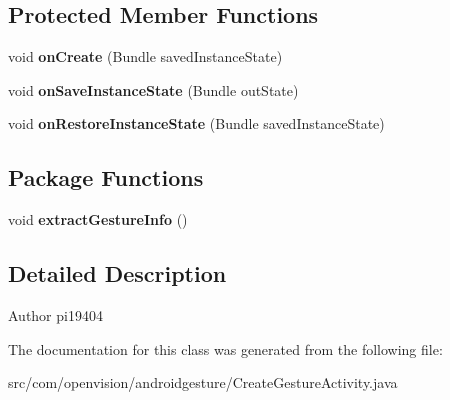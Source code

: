 \subsection*{\-Protected \-Member \-Functions}
\begin{DoxyCompactItemize}
\item 
\hypertarget{classcom_1_1openvision_1_1androidgesture_1_1CreateGestureActivity_a4e81a9e8913ce9db0ca81aa8aab43a62}{void {\bfseries on\-Create} (\-Bundle saved\-Instance\-State)}\label{classcom_1_1openvision_1_1androidgesture_1_1CreateGestureActivity_a4e81a9e8913ce9db0ca81aa8aab43a62}

\item 
\hypertarget{classcom_1_1openvision_1_1androidgesture_1_1CreateGestureActivity_a0b5e3f5d97404c75edc228910d093af5}{void {\bfseries on\-Save\-Instance\-State} (\-Bundle out\-State)}\label{classcom_1_1openvision_1_1androidgesture_1_1CreateGestureActivity_a0b5e3f5d97404c75edc228910d093af5}

\item 
\hypertarget{classcom_1_1openvision_1_1androidgesture_1_1CreateGestureActivity_ac77cfb3c65018452e2e8951b6311492c}{void {\bfseries on\-Restore\-Instance\-State} (\-Bundle saved\-Instance\-State)}\label{classcom_1_1openvision_1_1androidgesture_1_1CreateGestureActivity_ac77cfb3c65018452e2e8951b6311492c}

\end{DoxyCompactItemize}
\subsection*{\-Package \-Functions}
\begin{DoxyCompactItemize}
\item 
\hypertarget{classcom_1_1openvision_1_1androidgesture_1_1CreateGestureActivity_a3ba84402193be3a929c761d54ca9f185}{void {\bfseries extract\-Gesture\-Info} ()}\label{classcom_1_1openvision_1_1androidgesture_1_1CreateGestureActivity_a3ba84402193be3a929c761d54ca9f185}

\end{DoxyCompactItemize}


\subsection{\-Detailed \-Description}
\begin{DoxyAuthor}{\-Author}
pi19404 
\end{DoxyAuthor}


\-The documentation for this class was generated from the following file\-:\begin{DoxyCompactItemize}
\item 
src/com/openvision/androidgesture/\-Create\-Gesture\-Activity.\-java\end{DoxyCompactItemize}
